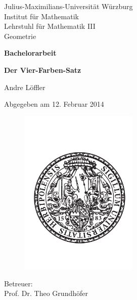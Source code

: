 \begin{titlepage}
  Julius-Maximilians-Universität Würzburg\\
  Institut für Mathematik\\
  Lehrstuhl für Mathematik III\\
  Geometrie
  
  \vspace{2cm}
  
  \begin{center}
   \LARGE\textbf{Bachelorarbeit}
  \end{center}
  
  \vspace{0cm}
  
  \begin{center}
   \huge\textbf{Der Vier-Farben-Satz}
  \end{center}
  
  \vspace{1cm}
  
  \begin{center}
   \Large Andre Löffler
  \end{center}
  
  \vspace{0cm}
  
  \begin{center}
   \Large Abgegeben am 12. Februar 2014
  \end{center}
  
  \begin{figure}[ht]
    \begin{center}
      \includegraphics[height=8cm]{siegel.pdf}  
    \end{center}
  \end{figure}
  
  \begin{center}
   \Large Betreuer:\\ Prof. Dr. Theo Grundhöfer
  \end{center}
\end{titlepage}